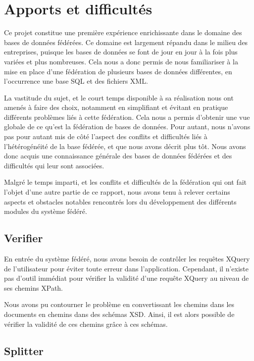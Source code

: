 \section{Apports et difficultés}

Ce projet constitue une première expérience enrichissante dans le domaine des bases de données fédérées. Ce domaine est largement répandu dans le milieu des entreprises, puisque les bases de données se font de jour en jour à la fois plus variées et plus nombreuses. Cela nous a donc permis de nous familiariser à la mise en place d’une fédération de plusieurs bases de données différentes, en l’occurrence une base SQL et des fichiers XML.

La vastitude du sujet, et le court temps disponible à sa réalisation nous ont amenés à faire des choix, notamment en simplifiant et évitant en pratique différents problèmes liés à cette fédération. Cela nous a permis d’obtenir une vue globale de ce qu’est la fédération de bases de données. Pour autant, nous n’avons pas pour autant mis de côté l’aspect des conflits et difficultés liés à l’hétérogénéité de la base fédérée, et que nous avons décrit plus tôt. Nous avons donc acquis une connaissance générale des bases de données fédérées et des difficultés qui leur sont associées.

Malgré le temps imparti, et les conflits et difficultés de la fédération qui ont fait l’objet d’une autre partie de ce rapport, nous avons tenu à relever certains aspects et obstacles notables rencontrés lors du développement des différents modules du système fédéré.

\subsection{Verifier}

En entrée du système fédéré, nous avons besoin de contrôler les requêtes XQuery de l’utilisateur pour éviter toute erreur dans l’application. Cependant, il n’existe pas d’outil immédiat pour vérifier la validité d’une requête XQuery au niveau de ses chemins XPath.

Nous avons pu contourner le problème en convertissant les chemins dans les documents en chemins dans des schémas XSD. Ainsi, il est alors possible de vérifier la validité de ces chemins grâce à ces schémas.

\subsection{Splitter}

